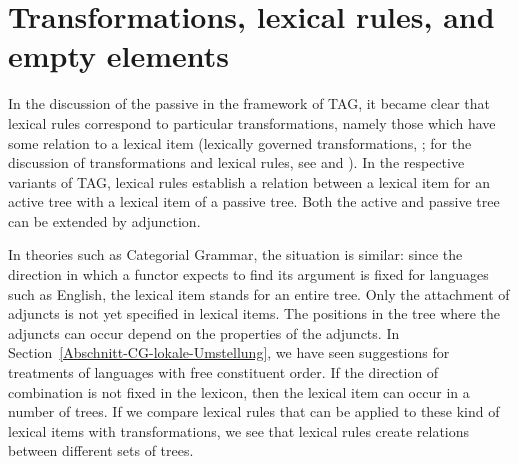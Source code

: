 \section{Transformations, lexical rules, and empty elements}
\label{Abschnitt-leere-Elemente-LRs-Transformations}

In the discussion of the passive in the framework of TAG, it became clear that lexical rules
correspond to particular transformations, namely those which have some relation to a lexical item (lexically governed transformations, \citealp{Dowty78a}; 
for the discussion of transformations and lexical rules, see  and ). In the respective variants of TAG\indextag, lexical rules establish a relation
between a lexical item for an active tree with a lexical item of a passive tree. Both the active and passive tree can be extended by adjunction.

In theories such as Categorial Grammar\indexcg, the situation is similar: since the direction in which a functor expects to find its argument is fixed
for languages such as English, the lexical item stands for an entire tree. Only the attachment of
adjuncts is not yet specified in lexical items. The positions in the
tree where the adjuncts can occur depend on the properties of the adjuncts. In Section~\ref{Abschnitt-CG-lokale-Umstellung},
we have seen suggestions for treatments of languages with free constituent order. If the direction of combination is not fixed in the lexicon, then the lexical item
can occur in a number of trees. If we compare lexical rules that can be applied to these kind of lexical items with transformations, we see that lexical rules create relations
between different sets of trees.

